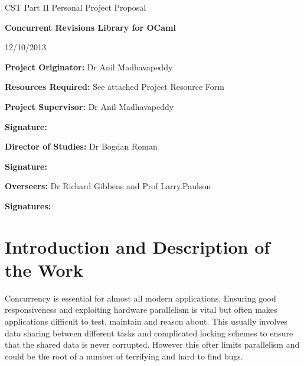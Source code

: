 

\newcommand{\al}{$<$}
\newcommand{\ar}{$>$}

\parindent 0pt
\parskip 6pt



\thispagestyle{empty}

\medskip
{}
\medskip
{}

\vfil

\centerline{\large CST Part II Personal Project Proposal}
\vspace{0.4in}
\centerline{\Large\bf Concurrent Revisions Library for OCaml}
\vspace{0.3in}
\centerline{\large {12/10/2013}}

\vfil

{\bf Project Originator:} Dr Anil Madhavapeddy

\vspace{0.1in}

{\bf Resources Required:} See attached Project Resource Form

\vspace{0.5in}

{\bf Project Supervisor:} Dr Anil Madhavapeddy

\vspace{0.2in}

{\bf Signature:}

\vspace{0.5in}

{\bf Director of Studies:} Dr Bogdan Roman

\vspace{0.2in}

{\bf Signature:}

\vspace{0.5in}

{\bf Overseers:} Dr Richard Gibbens and Prof Larry.Paulson

\vspace{0.2in}

{\bf Signatures:} 

\vfil
\eject

\section*{Introduction and Description of the Work}

Concurrency is essential for almost all modern applications. Ensuring good responsiveness and exploiting hardware parallelism is vital but often makes applications difficult to test, maintain and reason about. This usually involves data sharing between different tasks and complicated locking schemes to ensure that the shared data is never corrupted. However  this ofter limits parallelism and could be the root of a number of terrifying and hard to find bugs.

